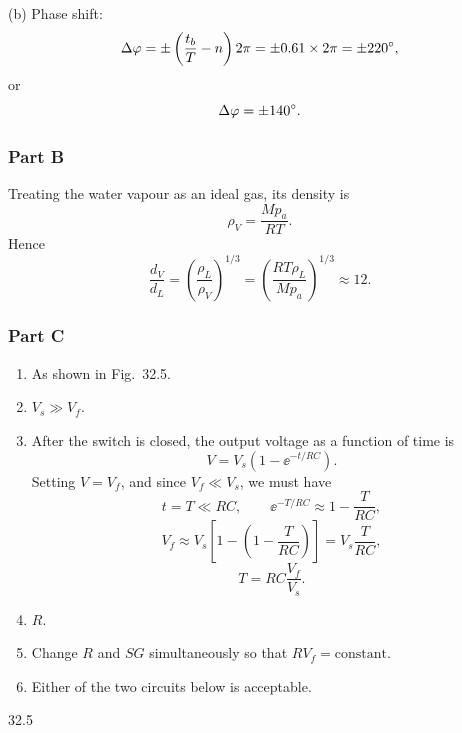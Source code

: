 (b) Phase shift:
\[
\Delta\varphi=\pm\left(\frac{t_b}{T}-n\right)2\pi=\pm0.61\times2\pi=\pm220^{\circ},
\]
or
\[
\Delta\varphi=\pm140^{\circ}.
\]

\subsubsection*{Part B}

Treating the water vapour as an ideal gas, its density is
\[
\rho_V=\frac{Mp_a}{RT}.
\]
Hence
\[
\frac{d_V}{d_L}=\left(\frac{\rho_L}{\rho_V}\right)^{1/3}
=\left(\frac{RT\rho_L}{Mp_a}\right)^{1/3}\approx12.
\]

\subsubsection*{Part C}

\begin{enumerate}
\item[(a)] As shown in Fig.~32.5.
\item[(b)] $V_s\gg V_f$.
\item[(c)] After the switch is closed, the output voltage as a function of time is
\[
V=V_s\left(1-\ee^{-t/RC}\right).
\]
Setting $V=V_f$, and since $V_f\ll V_s$, we must have
\[
t=T\ll RC,\qquad \ee^{-T/RC}\approx1-\frac{T}{RC},
\]
\[
V_f\approx V_s\left[1-\left(1-\frac{T}{RC}\right)\right]=V_s\frac{T}{RC},
\]
\[
T=RC\frac{V_f}{V_s}.
\]
\item[(d)] $R$.
\item[(e)] Change $R$ and $SG$ simultaneously so that $RV_f=\text{constant}$.
\item[(f)] Either of the two circuits below is acceptable.
\end{enumerate}

\begin{figbox}{32.5}
\end{figbox}

